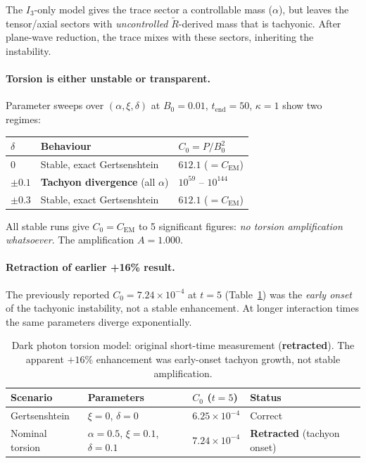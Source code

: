 The $I_3$-only model gives the trace sector a controllable mass ($\alpha$), but
leaves the tensor/axial sectors with \emph{uncontrolled} $\widetilde R$-derived mass
that is tachyonic.  After plane-wave reduction, the trace mixes with these sectors,
inheriting the instability.

\paragraph{Torsion is either unstable or transparent.}
Parameter sweeps over $(\alpha, \xi, \delta)$ at $B_0 = 0.01$, $t_\text{end} = 50$,
$\kappa = 1$ show two regimes:

\begin{center}
\begin{tabular}{@{}lll@{}}
\toprule
$\delta$ & Behaviour & $C_0 = P/B_0^2$ \\
\midrule
$0$ & Stable, exact Gertsenshtein & $612.1$ ($= C_\text{EM}$) \\
$\pm 0.1$ & \textbf{Tachyon divergence} (all $\alpha$) & $10^{59}$ -- $10^{144}$ \\
$\pm 0.3$ & Stable, exact Gertsenshtein & $612.1$ ($= C_\text{EM}$) \\
\bottomrule
\end{tabular}
\end{center}

All stable runs give $C_0 = C_\text{EM}$ to 5 significant figures:
\emph{no torsion amplification whatsoever}.  The amplification $A = 1.000$.

\paragraph{Retraction of earlier +16\% result.}
The previously reported $C_0 = 7.24 \times 10^{-4}$ at $t = 5$ (Table~\ref{tab:dark-photon-results-retracted})
was the \emph{early onset} of the tachyonic instability, not a stable enhancement.
At longer interaction times the same parameters diverge exponentially.

\begin{table}[htbp]
\centering
\caption{Dark photon torsion model: original short-time measurement (\textbf{retracted}).
  The apparent $+16\%$ enhancement was early-onset tachyon growth, not stable
  amplification.}
\label{tab:dark-photon-results-retracted}
\begin{tabular}{@{}llll@{}}
\toprule
Scenario & Parameters & $C_0$ ($t{=}5$) & Status \\
\midrule
Gertsenshtein & $\xi = 0$, $\delta = 0$ & $6.25 \times 10^{-4}$ & Correct \\
Nominal torsion & $\alpha=0.5$, $\xi=0.1$, $\delta=0.1$ & $7.24 \times 10^{-4}$ & \textbf{Retracted} (tachyon onset) \\
\bottomrule
\end{tabular}
\end{table}

